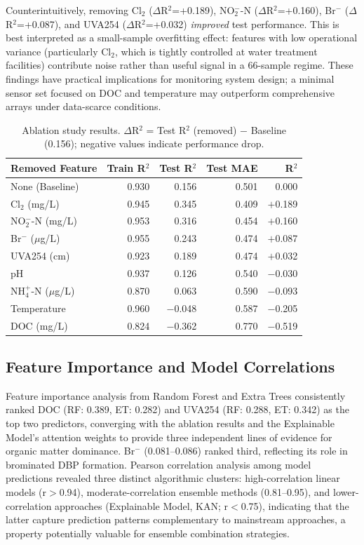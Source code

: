 \documentclass[runningheads]{llncs}
\begin{document}
Counterintuitively, removing Cl$_2$ ($\Delta$R$^2$=+0.189), NO$_2^-$-N ($\Delta$R$^2$=+0.160), Br$^-$ ($\Delta$R$^2$=+0.087), and UVA254 ($\Delta$R$^2$=+0.032) \textit{improved} test performance. This is best interpreted as a small-sample overfitting effect: features with low operational variance (particularly Cl$_2$, which is tightly controlled at water treatment facilities) contribute noise rather than useful signal in a 66-sample regime. These findings have practical implications for monitoring system design; a minimal sensor set focused on DOC and temperature may outperform comprehensive arrays under data-scarce conditions.

\begin{table}[t]
\caption{Ablation study results. $\Delta$R$^2$ = Test R$^2$ (removed) $-$ Baseline (0.156); negative values indicate performance drop.}
\label{tab:ablation_results}
\centering
\footnotesize
\begin{tabular}{lrrrr}
\toprule
\textbf{Removed Feature} & \textbf{Train R$^2$} & \textbf{Test R$^2$} & \textbf{Test MAE} & \boldmath{$\Delta$}\textbf{R$^2$} \\
\midrule
None (Baseline) & 0.930 & 0.156 & 0.501 & 0.000 \\
\midrule
Cl$_2$ (mg/L)           & 0.945 & 0.345 & 0.409 & $+$0.189 \\
NO$_2^-$-N (mg/L)       & 0.953 & 0.316 & 0.454 & $+$0.160 \\
Br$^-$ ($\mu$g/L)       & 0.955 & 0.243 & 0.474 & $+$0.087 \\
UVA254 (cm)             & 0.923 & 0.189 & 0.474 & $+$0.032 \\
pH                      & 0.937 & 0.126 & 0.540 & $-$0.030 \\
NH$_4^+$-N ($\mu$g/L)   & 0.870 & 0.063 & 0.590 & $-$0.093 \\
Temperature             & 0.960 & $-$0.048 & 0.587 & $-$0.205 \\
DOC (mg/L)              & 0.824 & $-$0.362 & 0.770 & $-$0.519 \\
\bottomrule
\end{tabular}
\end{table}

\subsection{Feature Importance and Model Correlations}

Feature importance analysis from Random Forest and Extra Trees consistently ranked DOC (RF: 0.389, ET: 0.282) and UVA254 (RF: 0.288, ET: 0.342) as the top two predictors, converging with the ablation results and the Explainable Model's attention weights to provide three independent lines of evidence for organic matter dominance. Br$^-$ (0.081--0.086) ranked third, reflecting its role in brominated DBP formation. Pearson correlation analysis among model predictions revealed three distinct algorithmic clusters: high-correlation linear models (r$>$0.94), moderate-correlation ensemble methods (0.81--0.95), and lower-correlation approaches (Explainable Model, KAN; r$<$0.75), indicating that the latter capture prediction patterns complementary to mainstream approaches, a property potentially valuable for ensemble combination strategies.
\end{document}
